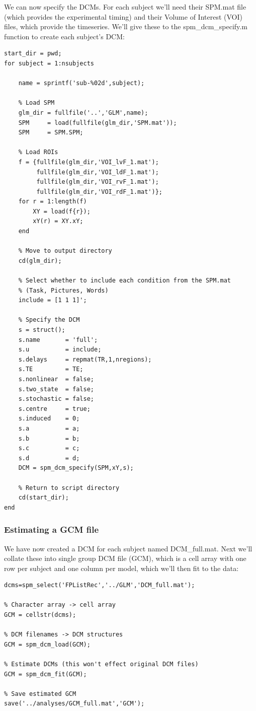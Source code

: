\documentclass{article}
\begin{document}
We can now specify the DCMs. For each subject we'll need their SPM.mat file (which provides the experimental timing) and their Volume of Interest (VOI) files, which provide the timeseries. We'll give these to the spm\_dcm\_specify.m function to create each subject's DCM:

\begin{lstlisting}[style=Matlab-editor,caption=DCM specification]
start_dir = pwd;
for subject = 1:nsubjects
    
    name = sprintf('sub-%02d',subject);
    
    % Load SPM
    glm_dir = fullfile('..','GLM',name);
    SPM     = load(fullfile(glm_dir,'SPM.mat'));
    SPM     = SPM.SPM;
    
    % Load ROIs
    f = {fullfile(glm_dir,'VOI_lvF_1.mat');
         fullfile(glm_dir,'VOI_ldF_1.mat');
         fullfile(glm_dir,'VOI_rvF_1.mat');
         fullfile(glm_dir,'VOI_rdF_1.mat')};    
    for r = 1:length(f)
        XY = load(f{r});
        xY(r) = XY.xY;
    end
    
    % Move to output directory
    cd(glm_dir);
    
    % Select whether to include each condition from the SPM.mat
    % (Task, Pictures, Words)
    include = [1 1 1]';

    % Specify the DCM
    s = struct();
    s.name       = 'full';
    s.u          = include;                 
    s.delays     = repmat(TR,1,nregions);
    s.TE         = TE;
    s.nonlinear  = false;
    s.two_state  = false;
    s.stochastic = false;
    s.centre     = true;
    s.induced    = 0;
    s.a          = a;
    s.b          = b;
    s.c          = c;
    s.d          = d;
    DCM = spm_dcm_specify(SPM,xY,s);
    
    % Return to script directory
    cd(start_dir);
end
\end{lstlisting}

\subsubsection{Estimating a GCM file}

We have now created a DCM for each subject named DCM\_full.mat. Next we'll collate these into single group DCM file (GCM), which is a cell array with one row per subject and one column per model, which we'll then fit to the data:

\begin{lstlisting}[style=Matlab-editor, caption=Estimating models]
% Find all DCM files
dcms=spm_select('FPListRec','../GLM','DCM_full.mat');

% Character array -> cell array
GCM = cellstr(dcms);
    
% DCM filenames -> DCM structures
GCM = spm_dcm_load(GCM);

% Estimate DCMs (this won't effect original DCM files)
GCM = spm_dcm_fit(GCM);

% Save estimated GCM
save('../analyses/GCM_full.mat','GCM');
    
\end{lstlisting}
\end{document}
